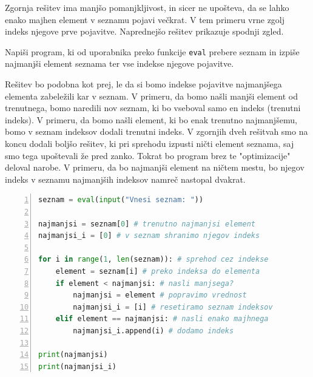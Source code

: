 Zgornja rešitev ima manjšo pomanjkljivost, in sicer ne upošteva, da se lahko enako majhen element v seznamu pojavi večkrat. V tem primeru vrne zgolj indeks njegove prve pojavitve. Naprednejšo rešitev prikazuje spodnji zgled.

\begin{zgled}
Napiši program, ki od uporabnika preko funkcije \texttt{eval} prebere seznam in izpiše najmanjši element seznama ter vse indekse njegove pojavitve. 
\end{zgled}
\begin{resitev}
Rešitev bo podobna kot prej, le da si bomo indekse pojavitve najmanjšega elementa zabeležili kar v seznam. V primeru, da bomo našli manjši element od trenutnega, bomo naredili nov seznam, ki bo vseboval samo en indeks (trenutni indeks). V primeru, da bomo našli element, ki bo enak trenutno najmanjšemu, bomo v seznam indeksov dodali trenutni indeks. V zgornjih dveh rešitvah smo na koncu dodali boljšo rešitev, ki pri sprehodu izpusti ničti element seznama, saj smo tega upoštevali že pred zanko. Tokrat bo program brez te "optimizacije" deloval narobe. V primeru, da bo najmanjši element na ničtem mestu, bo njegov indeks v seznamu najmanjših indeksov namreč nastopal dvakrat.
\begin{lstlisting}[language=Python,numbers=left]
seznam = eval(input("Vnesi seznam: "))

najmanjsi = seznam[0] # trenutno najmanjsi element
najmanjsi_i = [0] # v seznam shranimo njegov indeks

for i in range(1, len(seznam)): # sprehod cez indekse
    element = seznam[i] # preko indeksa do elementa
    if element < najmanjsi: # nasli manjsega?
        najmanjsi = element # popravimo vrednost
        najmanjsi_i = [i] # resetiramo seznam indeksov
    elif element == najmanjsi: # nasli enako majhnega
        najmanjsi_i.append(i) # dodamo indeks

print(najmanjsi)
print(najmanjsi_i)
\end{lstlisting}
\end{resitev}


